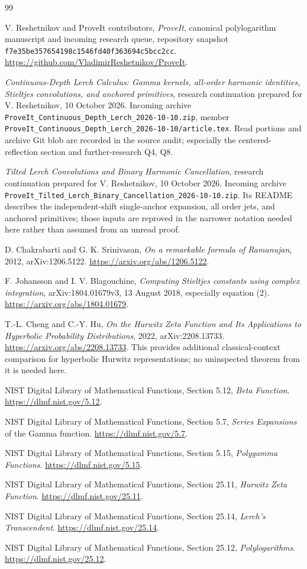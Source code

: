 \documentclass[11pt,letterpaper]{article}
\theoremstyle{definition}\newtheorem{definition}[theorem]{Definition}
\theoremstyle{remark}\newtheorem{remark}[theorem]{Remark}
\newcommand{\src}[1]{\nolinkurl{#1}}
\newcommand{\pin}{\src{f7e35be357654198c1546fd40f363694c5bcc2cc}}
\begin{document}
\begin{thebibliography}{99}
V. Reshetnikov and ProveIt contributors,
\emph{ProveIt}, canonical polylogarithm manuscript
and incoming research queue, repository snapshot \pin.
\url{https://github.com/VladimirReshetnikov/ProveIt}.

\emph{Continuous-Depth Lerch Calculus: Gamma kernels, all-order harmonic
identities, Stieltjes convolutions, and anchored primitives}, research
continuation prepared for V. Reshetnikov, 10 October 2026.
Incoming archive \src{ProveIt_Continuous_Depth_Lerch_2026-10-10.zip},
member \src{ProveIt_Continuous_Depth_Lerch_2026-10-10/article.tex}.
Read portions and archive Git blob are recorded in the source audit;
especially the centered-reflection section and further-research Q4, Q8.

\emph{Tilted Lerch Convolutions and Binary Harmonic Cancellation},
research continuation prepared for V. Reshetnikov, 10 October 2026.
Incoming archive \src{ProveIt_Tilted_Lerch_Binary_Cancellation_2026-10-10.zip}.
Its README describes the independent-shift single-anchor expansion,
all order jets, and anchored primitives; those inputs are reproved
in the narrower notation needed here rather than assumed from an unread proof.

D. Chakrabarti and G. K. Srinivasan,
\emph{On a remarkable formula of Ramanujan}, 2012,
arXiv:1206.5122. \url{https://arxiv.org/abs/1206.5122}.

F. Johansson and I. V. Blagouchine,
\emph{Computing Stieltjes constants using complex integration},
arXiv:1804.01679v3, 13 August 2018, especially equation (2).
\url{https://arxiv.org/abs/1804.01679}.

T.-L. Cheng and C.-Y. Hu,
\emph{On the Hurwitz Zeta Function and Its Applications to Hyperbolic
Probability Distributions}, 2022, arXiv:2208.13733.
\url{https://arxiv.org/abs/2208.13733}.
This provides additional classical-context comparison for hyperbolic
Hurwitz representations; no uninspected theorem from it is needed here.

NIST Digital Library of Mathematical Functions,
Section 5.12, \emph{Beta Function}.
\url{https://dlmf.nist.gov/5.12}.

NIST Digital Library of Mathematical Functions,
Section 5.7, \emph{Series Expansions} of the Gamma function.
\url{https://dlmf.nist.gov/5.7}.

NIST Digital Library of Mathematical Functions,
Section 5.15, \emph{Polygamma Functions}.
\url{https://dlmf.nist.gov/5.15}.

NIST Digital Library of Mathematical Functions,
Section 25.11, \emph{Hurwitz Zeta Function}.
\url{https://dlmf.nist.gov/25.11}.

NIST Digital Library of Mathematical Functions,
Section 25.14, \emph{Lerch's Transcendent}.
\url{https://dlmf.nist.gov/25.14}.

NIST Digital Library of Mathematical Functions,
Section 25.12, \emph{Polylogarithms}.
\url{https://dlmf.nist.gov/25.12}.
\end{thebibliography}
\end{document}
